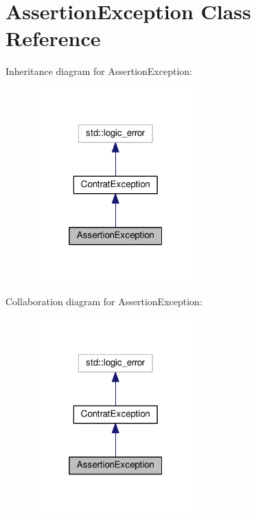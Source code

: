 \hypertarget{classAssertionException}{}\section{Assertion\+Exception Class Reference}
\label{classAssertionException}


Inheritance diagram for Assertion\+Exception\+:\nopagebreak
\begin{figure}[H]
\begin{center}
\leavevmode
\includegraphics[width=181pt]{classAssertionException__inherit__graph}
\end{center}
\end{figure}


Collaboration diagram for Assertion\+Exception\+:\nopagebreak
\begin{figure}[H]
\begin{center}
\leavevmode
\includegraphics[width=181pt]{classAssertionException__coll__graph}
\end{center}
\end{figure}
